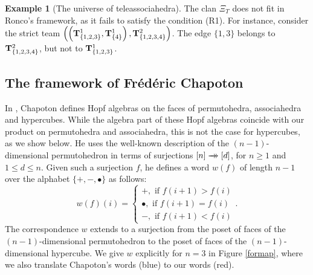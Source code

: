 \documentclass{article}
\theoremstyle{plain}
\theoremstyle{definition}
\newtheorem{example}[thm]{\sc Example}
\newcommand{\set}[1]{\{#1\}}
\newcommand{\hyper}[1]{{\bf #1}}
\newcommand{\doublearrow}[1]{\xrightarrow[]{#1}\mathrel{\mkern-14mu}\rightarrow}
\begin{document}
\begin{example}[The universe of teleassociahedra]
\smallskip
 

 

 The clan $\Xi_T$ does not fit in Ronco's framework, as it fails to satisfy the condition (R1). For instance, consider the strict team $\left( \left( \hyper{T}_{\set{1,2,3}}^1, \hyper{T}^1_{\{4\}} \right), \hyper{T}_{\set{1,2,3,4}}^2 \right)$. The edge $\{1,3\}$ belongs to $\hyper{T}^2_{\set{1,2,3,4}}$, but not to  $\hyper{T}_{\set{1,2,3}}^1$.
 


    
\end{example}
 \subsection{The framework of Fr\' ed\' eric Chapoton \cite{Cha1}}
In \cite{Cha1}, Chapoton defines  Hopf algebras on the faces of permutohedra, associahedra and hypercubes. 
While the algebra part of these Hopf algebras coincide with our product on permutohedra and associahedra, this is not the case for hypercubes, as we show below. 
 He uses the well-known description of the $(n-1)$-dimensional permutohedron  in terms of surjections $[n]\doublearrow{}[d]$,  for $n\geq 1$ and $1\leq d\leq n$. Given such a surjection $f$, he defines a word $w(f)$ of 
length $n-1$ over the alphabet $\{+,-,\bullet\}$ as follows: $$w(f)(i)=\begin{cases}
+ , \mbox{ if } f(i+1)>f(i) \\
\bullet , \mbox{ if } f(i+1)=f(i) \\
- , \mbox{ if } f(i+1)<f(i) 
\end{cases}.$$
The correspondence $w$ extends to a surjection from the poset of faces of the $(n-1)$-dimensional permutohedron to the poset of faces of the $(n-1)$-dimensional hypercube. We give $w$ explicitly for $n=3$  in Figure \ref{formap}, where we also translate Chapoton's words (blue) to our words (red).
\end{document}
